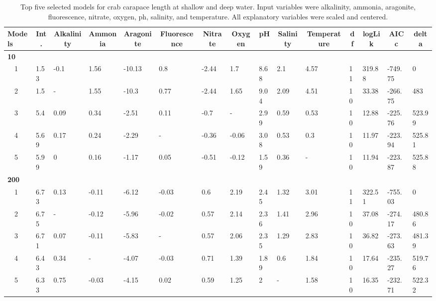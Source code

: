 \documentclass[letterpaper,12pt]{article}\usepackage[]{graphicx}\usepackage[]{color}
\begin{document}
\begin{landscape}
\centering\vspace*{\fill}
\begin{table}[!tbp]
{\scriptsize
\caption{Top five selected models for crab carapace length at shallow and deep water. Input variables were alkalinity, ammonia, aragonite, fluorescence, nitrate, oxygen, ph, salinity, and temperature.  All explanatory variables were scaled and centered.\label{tab:cltab}} 
\begin{center}
\begin{tabular}{lllllllllllllll}
\hline\hline
\multicolumn{1}{l}{Models}&\multicolumn{1}{c}{Int.}&\multicolumn{1}{c}{Alkalinity}&\multicolumn{1}{c}{Ammonia}&\multicolumn{1}{c}{Aragonite}&\multicolumn{1}{c}{Fluorescence}&\multicolumn{1}{c}{Nitrate}&\multicolumn{1}{c}{Oxygen}&\multicolumn{1}{c}{pH}&\multicolumn{1}{c}{Salinity}&\multicolumn{1}{c}{Temperature}&\multicolumn{1}{c}{df}&\multicolumn{1}{c}{logLik}&\multicolumn{1}{c}{AICc}&\multicolumn{1}{c}{delta}\tabularnewline
\hline
{\bfseries 10}&&&&&&&&&&&&&&\tabularnewline
~~1&1.53&-0.1&1.56&-10.13&0.8&-2.44&1.7&8.68&2.1&4.57&11&319.88&-749.75&0\tabularnewline
~~2&1.5&-&1.55&-10.3&0.77&-2.44&1.65&9.04&2.09&4.51&10&33.38&-266.75&483\tabularnewline
~~3&5.4&0.09&0.34&-2.51&0.11&-0.7&-&2.99&0.59&0.53&10&12.88&-225.76&523.99\tabularnewline
~~4&5.69&0.17&0.24&-2.29&-&-0.36&-0.06&3.08&0.53&0.3&10&11.97&-223.94&525.81\tabularnewline
~~5&5.99&0&0.16&-1.17&0.05&-0.51&-0.12&1.59&0.36&-&10&11.94&-223.87&525.88\tabularnewline
\hline
{\bfseries 200}&&&&&&&&&&&&&&\tabularnewline
~~1&6.73&0.13&-0.11&-6.12&-0.03&0.6&2.19&2.45&1.32&3.01&11&322.51&-755.03&0\tabularnewline
~~2&6.75&-&-0.12&-5.96&-0.02&0.57&2.14&2.36&1.41&2.96&10&37.08&-274.17&480.86\tabularnewline
~~3&6.71&0.07&-0.11&-5.83&-&0.57&2.06&2.35&1.29&2.83&10&36.82&-273.63&481.39\tabularnewline
~~4&6.43&0.34&-&-4.07&-0.03&0.71&1.39&1.89&0.6&1.84&10&17.64&-235.27&519.76\tabularnewline
~~5&6.33&0.75&-0.03&-4.15&0.02&0.59&1.25&2&-&1.58&10&16.35&-232.71&522.32\tabularnewline
\hline
\end{tabular}\end{center}}
\end{table}

\end{landscape}
\end{document}
